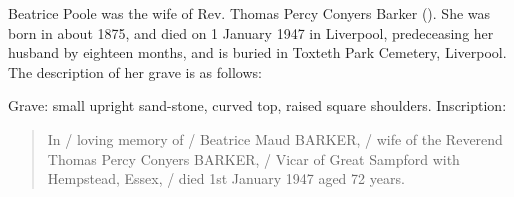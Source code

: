 
Beatrice Poole was the wife of Rev. Thomas Percy Conyers Barker ().
She was born in about 1875, and died on 1 January 1947 in Liverpool, predeceasing her husband by eighteen months, and is buried in Toxteth Park Cemetery, Liverpool.  The description of her grave is as follows:

Grave: small upright sand-stone, curved top, raised square shoulders.\cite{ToxtethParkCemeteryInscriptions} Inscription:
\begin{quotation}
In / loving memory of / Beatrice Maud BARKER, / wife of the Reverend Thomas Percy Conyers BARKER, / Vicar of Great Sampford with Hempstead, Essex, / died 1st January 1947 aged 72 years.
\end{quotation}

% 
% 
% 
% 
% 
% 
% 
%  	 	 	 	 	 	 	 	 	 	 	 
% 
% 
